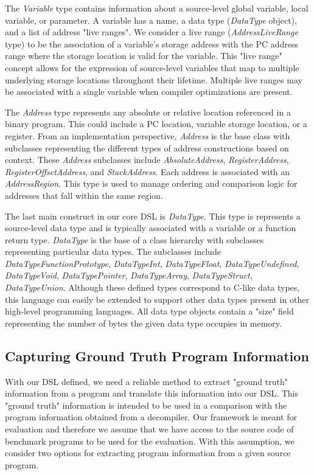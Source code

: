 \documentclass[conference]{IEEEtran}
\begin{document}
The \emph{Variable} type contains information about a source-level global variable, local variable, or parameter. A variable has a name, a data type (\emph{DataType} object), and a list of address "live ranges". We consider a live range (\emph{AddressLiveRange} type) to be the association of a variable's storage address with the PC address range where the storage location is valid for the variable. This "live range" concept allows for the expression of source-level variables that map to multiple underlying storage locations throughout their lifetime. Multiple live ranges may be associated with a single variable when compiler optimizations are present.

The \emph{Address} type represents any absolute or relative location referenced in a binary program. This could include a PC location, variable storage location, or a register. From an implementation perspective, \emph{Address} is the base class with subclasses representing the different types of address constructions based on context. These \emph{Address} subclasses include \emph{AbsoluteAddress}, \emph{RegisterAddress}, \emph{RegisterOffsetAddress}, and \emph{StackAddress}. Each address is associated with an \emph{AddressRegion}. This type is used to manage ordering and comparison logic for addresses that fall within the same region.

The last main construct in our core DSL is \emph{DataType}. This type is represents a source-level data type and is typically associated with a variable or a function return type. \emph{DataType} is the base of a class hierarchy with subclasses representing particular data types. The subclasses include \emph{DataTypeFunctionPrototype}, \emph{DataTypeInt}, \emph{DataTypeFloat}, \emph{DataTypeUndefined}, \emph{DataTypeVoid}, \emph{DataTypePointer}, \emph{DataTypeArray}, \emph{DataTypeStruct}, \emph{DataTypeUnion}. Although these defined types correspond to C-like data types, this language can easily be extended to support other data types present in other high-level programming languages. All data type objects contain a "size" field representing the number of bytes the given data type occupies in memory.

\subsection{Capturing Ground Truth Program Information}

With our DSL defined, we need a reliable method to extract "ground truth" information from a program and translate this information into our DSL. This "ground truth" information is intended to be used in a comparison with the program information obtained from a decompiler. Our framework is meant for evaluation and therefore we assume that we have access to the source code of benchmark programs to be used for the evaluation. With this assumption, we consider two options for extracting program information from a given source program.
\end{document}
